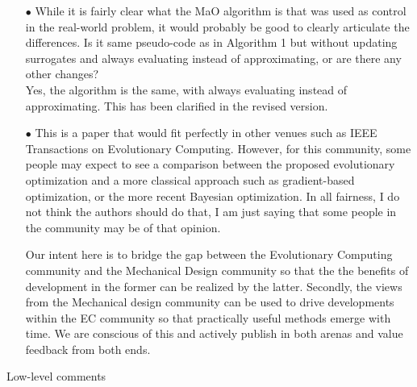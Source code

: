 \documentclass[onecolumn,10pt]{asme2ej}
\begin{document}
\begin{itemize}
\item[$\bullet$]	While it is fairly clear what the MaO algorithm is that was used as control in the real-world problem, it would probably be good to clearly articulate the differences. Is it same pseudo-code as in Algorithm 1 but without updating surrogates and always evaluating instead of approximating, or are there any other changes? \\

{\color{blue}Yes, the algorithm is the same, with always evaluating instead of approximating. This has been clarified in the revised version.}\\

\item[$\bullet$]	This is a paper that would fit perfectly in other venues such as IEEE Transactions on Evolutionary Computing. However, for this community, some people may expect to see a comparison between the proposed evolutionary optimization and a more classical approach such as gradient-based optimization, or the more recent Bayesian optimization. In all fairness, I do not think the authors should do that, I am just saying that some people in the community may be of that opinion.

{\color{blue}Our intent here is to bridge the gap between the Evolutionary Computing community and the Mechanical Design community so that the the benefits of development in the former can be realized by the latter. Secondly, the views from the Mechanical design community can be used to drive developments within the EC community so that practically useful methods emerge with time. We are conscious of this and actively publish in both arenas and value feedback from both ends. }\\

\end{itemize}

Low-level comments
\end{document}
